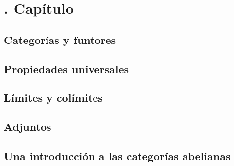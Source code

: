 \section[Vakil, 2017]{\cite{vakil2017}. Capítulo}

\setcounter{subsection}{1}
\subsection{Categorías y funtores}
    
    
    
\subsection{Propiedades universales}
    
    
    
    
    
\subsection{Límites y colímites}
    
\subsection{Adjuntos}
    
\subsection{Una introducción a las categorías abelianas}
    
    
